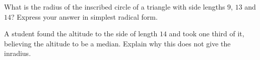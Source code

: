 What is the radius of the inscribed circle of a triangle with side lengths $9$, $13$ and $14$? Express your answer in simplest radical form.

A student found the altitude to the side of length $14$ and took one third of it, believing the altitude to be a median. Explain why this does not give the inradius.

